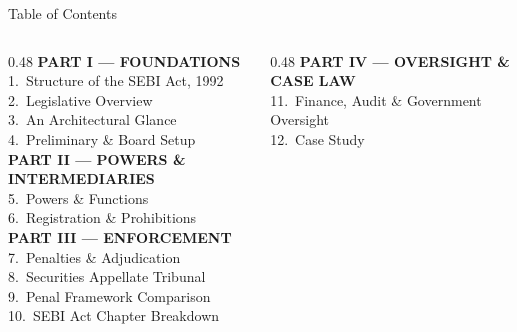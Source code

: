 \documentclass[aspectratio=169,10pt]{beamer}
\begin{document}
	\begin{frame}{Table of Contents}
		\vspace{-0.2cm}
		\begin{columns}[T, onlytextwidth]
			\begin{column}{0.48\textwidth}
				\textcolor{rpIris}{\textbf{\footnotesize PART I --- FOUNDATIONS}}\\[2pt]
				\textcolor{rpText}{\footnotesize 1.\ Structure of the SEBI Act, 1992}\\[1pt]
				\textcolor{rpText}{\footnotesize 2.\ Legislative Overview}\\[1pt]
				\textcolor{rpText}{\footnotesize 3.\ An Architectural Glance}\\[1pt]
				\textcolor{rpText}{\footnotesize 4.\ Preliminary \& Board Setup}\\[4pt]
				
				\textcolor{rpIris}{\textbf{\footnotesize PART II --- POWERS \& INTERMEDIARIES}}\\[2pt]
				\textcolor{rpText}{\footnotesize 5.\ Powers \& Functions}\\[1pt]
				\textcolor{rpText}{\footnotesize 6.\ Registration \& Prohibitions}\\[4pt]
				
				\textcolor{rpIris}{\textbf{\footnotesize PART III --- ENFORCEMENT}}\\[2pt]
				\textcolor{rpText}{\footnotesize 7.\ Penalties \& Adjudication}\\[1pt]
				\textcolor{rpText}{\footnotesize 8.\ Securities Appellate Tribunal}\\[1pt]
				\textcolor{rpText}{\footnotesize 9.\ Penal Framework Comparison}\\[1pt]
				\textcolor{rpText}{\footnotesize 10.\ SEBI Act Chapter Breakdown}
			\end{column}
			\begin{column}{0.48\textwidth}
				\textcolor{rpIris}{\textbf{\footnotesize PART IV --- OVERSIGHT \& CASE LAW}}\\[2pt]
				\textcolor{rpText}{\footnotesize 11.\ Finance, Audit \& Government Oversight}\\[1pt]
				\textcolor{rpText}{\footnotesize 12.\ Case Study}\\[4pt]
				

\end{column}
\end{columns}
\end{frame}
\end{document}
